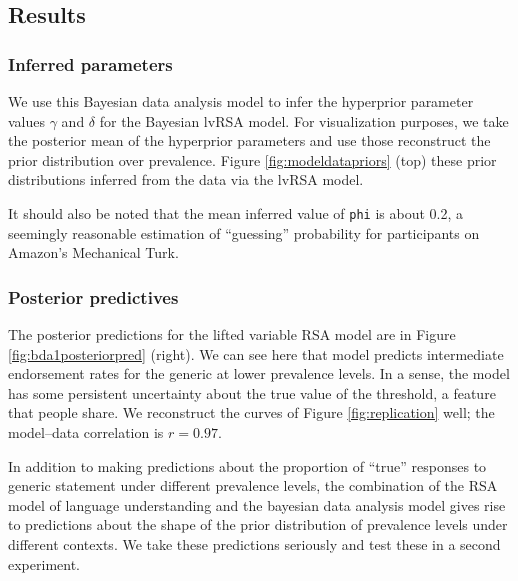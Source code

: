 \documentclass[10pt,letterpaper]{article}
\begin{document}
\subsection{Results}

\subsubsection{Inferred parameters}
We use this Bayesian data analysis model to infer the hyperprior parameter values $\gamma$ and $\delta$ for the Bayesian lvRSA model. For visualization purposes, we take the posterior mean of the hyperprior parameters and use those reconstruct the prior distribution over prevalence. Figure \ref{fig:modeldatapriors} (top) these prior distributions inferred from the data via the lvRSA model. 



It should also be noted that the mean inferred value of  \lstinline{phi} is about 0.2, a seemingly reasonable estimation of ``guessing'' probability for participants on Amazon's Mechanical Turk.

\subsubsection{Posterior predictives}
The posterior predictions for the lifted variable RSA model are in Figure \ref{fig:bda1posteriorpred} (right). We can see here that model predicts intermediate endorsement rates for the generic at lower prevalence levels. In a sense, the model has some persistent uncertainty about the true value of the threshold, a feature that people share. We reconstruct the curves of Figure \ref{fig:replication} well; the model--data correlation is $r = 0.97$.




In addition to making predictions about the proportion of ``true'' responses to generic statement under different prevalence levels, the combination of the RSA model of language understanding and the bayesian data analysis model gives rise to predictions about the shape of the prior distribution of prevalence levels under different contexts. We take these predictions seriously and test these in a second experiment. 
\end{document}
